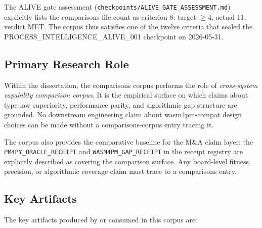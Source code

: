 The ALIVE gate assessment (\texttt{checkpoints/ALIVE\_GATE\_ASSESSMENT.md})
explicitly lists the comparisons file count as criterion 8: target $\geq 4$,
actual 11, verdict MET. The corpus thus satisfies one of the twelve criteria that
sealed the PROCESS\_INTELLIGENCE\_ALIVE\_001 checkpoint on 2026-05-31.

\subsection{Primary Research Role}
\label{sec:comparisons-identity-role}

Within the dissertation, the comparisons corpus performs the role of
\emph{cross-system capability comparison corpus}. It is the empirical surface on
which claims about type-law superiority, performance parity, and algorithmic gap
structure are grounded. No downstream engineering claim about wasm4pm-compat
design choices can be made without a comparisons-corpus entry tracing it.

The corpus also provides the comparative baseline for the M\&A claim layer: the
\texttt{PM4PY\_ORACLE\_RECEIPT} and \texttt{WASM4PM\_GAP\_RECEIPT} in the receipt
registry are explicitly described as covering the comparison surface. Any
board-level fitness, precision, or algorithmic coverage claim must trace to a
comparisons entry.

\subsection{Key Artifacts}
\label{sec:comparisons-identity-artifacts}

The key artifacts produced by or consumed in this corpus are:

